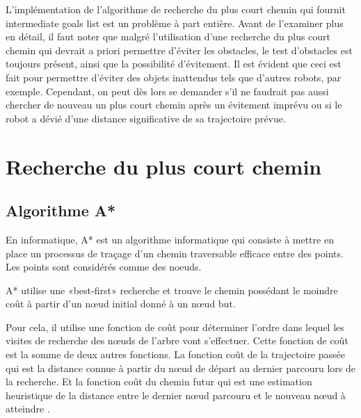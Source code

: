 L'implémentation de l'algorithme de recherche du plus court chemin qui fournit intermediate goals list est un problème à part entière. Avant de l'examiner plus en détail, il faut noter que malgré l'utilisation d'une recherche du plus court chemin qui devrait a priori permettre d'éviter les obstacles, le test d'obstacles est toujours présent, ainsi que la possibilité d'évitement. Il est évident que ceci est fait pour permettre d'éviter des objets inattendus tels que d'autres robots, par exemple. Cependant, on peut dès lors se demander s'il ne faudrait pas aussi chercher de nouveau un plus court chemin après un évitement imprévu ou si le robot a dévié d'une distance significative de sa trajectoire prévue.

\section{Recherche du plus court chemin}

\subsection{Algorithme A* \cite{wikiA*}}

En informatique, A* est un algorithme informatique qui consiste à mettre en place un processus de traçage d'un chemin traversable efficace entre des points. Les points sont considérés comme des noeuds.

A* utilise une «best-first» recherche et trouve le chemin possédant le moindre coût à partir d'un nœud initial donné à un nœud but.

Pour cela, il utilise une fonction de coût pour déterminer l'ordre dans lequel les visites de recherche des nœuds de l'arbre vont s'effectuer. Cette fonction de coût est la somme de deux autres fonctions. La fonction coût de la trajectoire passée qui est la distance connue à partir du nœud de départ au dernier parcouru lors de la recherche. Et la fonction coût du chemin futur qui est une estimation heuristique de la distance entre le dernier nœud parcouru et le nouveau nœud à atteindre .

